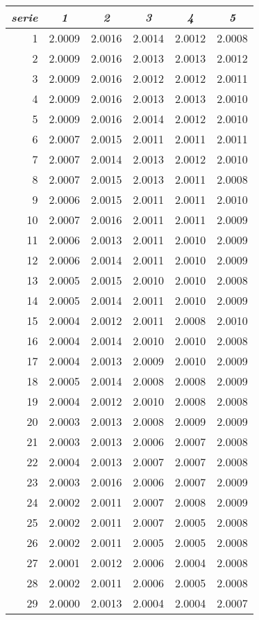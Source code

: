 \begin{tabular}{r*5c}
\emph{serie} &\emph{1} &\emph{2} &\emph{3} &\emph{4} &\emph{5}\\\hline
1 &2.0009 &2.0016 &2.0014 &2.0012 &2.0008\\
2 &2.0009 &2.0016 &2.0013 &2.0013 &2.0012\\
3 &2.0009 &2.0016 &2.0012 &2.0012 &2.0011\\
4 &2.0009 &2.0016 &2.0013 &2.0013 &2.0010\\
5 &2.0009 &2.0016 &2.0014 &2.0012 &2.0010\\
6 &2.0007 &2.0015 &2.0011 &2.0011 &2.0011\\
7 &2.0007 &2.0014 &2.0013 &2.0012 &2.0010\\
8 &2.0007 &2.0015 &2.0013 &2.0011 &2.0008\\
9 &2.0006 &2.0015 &2.0011 &2.0011 &2.0010\\
10 &2.0007 &2.0016 &2.0011 &2.0011 &2.0009\\
11 &2.0006 &2.0013 &2.0011 &2.0010 &2.0009\\
12 &2.0006 &2.0014 &2.0011 &2.0010 &2.0009\\
13 &2.0005 &2.0015 &2.0010 &2.0010 &2.0008\\
14 &2.0005 &2.0014 &2.0011 &2.0010 &2.0009\\
15 &2.0004 &2.0012 &2.0011 &2.0008 &2.0010\\
16 &2.0004 &2.0014 &2.0010 &2.0010 &2.0008\\
17 &2.0004 &2.0013 &2.0009 &2.0010 &2.0009\\
18 &2.0005 &2.0014 &2.0008 &2.0008 &2.0009\\
19 &2.0004 &2.0012 &2.0010 &2.0008 &2.0008\\
20 &2.0003 &2.0013 &2.0008 &2.0009 &2.0009\\
21 &2.0003 &2.0013 &2.0006 &2.0007 &2.0008\\
22 &2.0004 &2.0013 &2.0007 &2.0007 &2.0008\\
23 &2.0003 &2.0016 &2.0006 &2.0007 &2.0009\\
24 &2.0002 &2.0011 &2.0007 &2.0008 &2.0009\\
25 &2.0002 &2.0011 &2.0007 &2.0005 &2.0008\\
26 &2.0002 &2.0011 &2.0005 &2.0005 &2.0008\\
27 &2.0001 &2.0012 &2.0006 &2.0004 &2.0008\\
28 &2.0002 &2.0011 &2.0006 &2.0005 &2.0008\\
29 &2.0000 &2.0013 &2.0004 &2.0004 &2.0007\\

\end{tabular}
